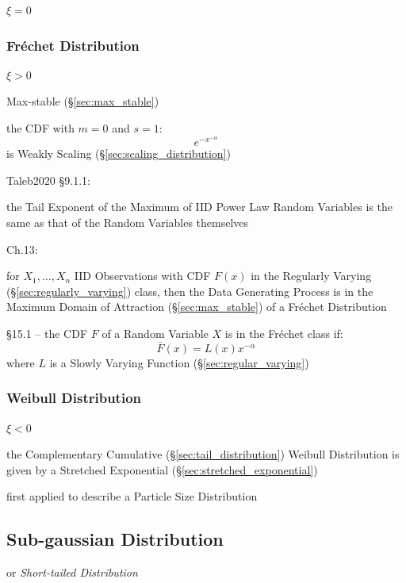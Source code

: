 $\xi = 0$



\subsubsection{Fr\'echet Distribution}\label{sec:frechet_distribution}

$\xi > 0$

Max-stable (\S\ref{sec:max_stable})

the CDF with $m = 0$ and $s = 1$:
\[
  e^{-x^{-\alpha}}
\]
is Weakly Scaling (\S\ref{sec:scaling_distribution})

Taleb2020 \S 9.1.1:

the Tail Exponent of the Maximum of IID Power Law Random Variables is the same
as that of the Random Variables themselves

Ch.13:

for $X_1, \ldots, X_n$ IID Observations with CDF $F(x)$ in the Regularly Varying
(\S\ref{sec:regularly_varying}) class, then the Data Generating Process is in
the Maximum Domain of Attraction (\S\ref{sec:max_stable}) of a Fr\'echet
Distribution

\S 15.1 -- the CDF $F$ of a Random Variable $X$ is in the Fr\'echet class if:
\[
  \bar{F}(x) = L(x) x^{-\alpha}
\]
where $L$ is a Slowly Varying Function (\S\ref{sec:regular_varying})



\subsubsection{Weibull Distribution}\label{sec:weibull_distribution}

$\xi < 0$

the Complementary Cumulative (\S\ref{sec:tail_distribution}) Weibull
Distribution is given by a Stretched Exponential
(\S\ref{sec:stretched_exponential})

first applied to describe a Particle Size Distribution



\subsection{Sub-gaussian Distribution}\label{sec:sub_gaussian}

or \emph{Short-tailed Distribution}

